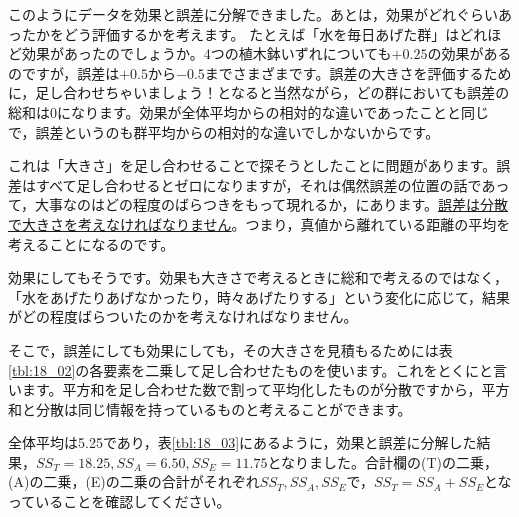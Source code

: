 \documentclass{ltjbook}
\begin{document}
このようにデータを効果と誤差に分解できました。あとは，効果がどれぐらいあったかをどう評価するかを考えます。
たとえば「水を毎日あげた群」はどれほど効果があったのでしょうか。4つの植木鉢いずれについても$+0.25$の効果があるのですが，誤差は$+0.5$から$-0.5$までさまざまです。誤差の大きさを評価するために，足し合わせちゃいましょう！となると当然ながら，どの群においても誤差の総和は$0$になります。効果が全体平均からの相対的な違いであったことと同じで，誤差というのも群平均からの相対的な違いでしかないからです。

これは「大きさ」を足し合わせることで探そうとしたことに問題があります。誤差はすべて足し合わせるとゼロになりますが，それは偶然誤差の位置の話であって，大事なのはどの程度のばらつきをもって現れるか，にあります。\underline{誤差は分散で大きさを考えなければなりません}。つまり，真値から離れている距離の平均を考えることになるのです。

効果にしてもそうです。効果も大きさで考えるときに総和で考えるのではなく，「水をあげたりあげなかったり，時々あげたりする」という変化に応じて，結果がどの程度ばらついたのかを考えなければなりません。

そこで，誤差にしても効果にしても，その大きさを見積もるためには表\ref{tbl:18_02}の各要素を二乗して足し合わせたものを使います。これをとくにと言います。平方和を足し合わせた数で割って平均化したものが分散ですから，平方和と分散は同じ情報を持っているものと考えることができます。



全体平均は5.25であり，表\ref{tbl:18_03}にあるように，効果と誤差に分解した結果，$SS_T=18.25,SS_A=6.50,SS_E=11.75$となりました。合計欄の(T)の二乗，(A)の二乗，(E)の二乗の合計がそれぞれ$SS_T,SS_A,SS_E$で，$SS_T=SS_A+SS_E$となっていることを確認してください。
\end{document}
